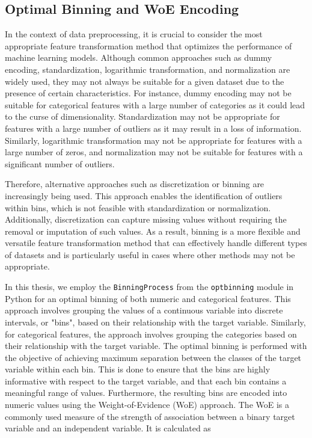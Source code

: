         \subsection{Optimal Binning and WoE Encoding}
        \label{subsec:prep-optbinning}
        
        In the context of data preprocessing, it is crucial to consider the most appropriate feature transformation method that optimizes the performance of machine learning models.
        Although common approaches such as dummy encoding, standardization, logarithmic transformation, and normalization are widely used, they may not always be suitable for a given dataset due to the presence of certain characteristics.
        For instance, dummy encoding may not be suitable for categorical features with a large number of categories as it could lead to the curse of dimensionality.
        Standardization may not be appropriate for features with a large number of outliers as it may result in a loss of information.
        Similarly, logarithmic transformation may not be appropriate for features with a large number of zeros, and normalization may not be suitable for features with a significant number of outliers.
        
        Therefore, alternative approaches such as discretization or binning are increasingly being used.
        This approach enables the identification of outliers within bins, which is not feasible with standardization or normalization.
        Additionally, discretization can capture missing values without requiring the removal or imputation of such values.
        As a result, binning is a more flexible and versatile feature transformation method that can effectively handle different types of datasets and is particularly useful in cases where other methods may not be appropriate.
        
        
        
        In this thesis, we employ the \lstinline{BinningProcess} from the \lstinline{optbinning} module in Python for an optimal binning of both numeric and categorical features.
        This approach involves grouping the values of a continuous variable into discrete intervals, or "bins", based on their relationship with the target variable.
        Similarly, for categorical features, the approach involves grouping the categories based on their relationship with the target variable.
        The optimal binning is performed with the objective of achieving maximum separation between the classes of the target variable within each bin.
        This is done to ensure that the bins are highly informative with respect to the target variable, and that each bin contains a meaningful range of values.
        Furthermore, the resulting bins are encoded into numeric values using the Weight-of-Evidence (WoE) approach. The WoE is a commonly used measure of the strength of association between a binary target variable and an independent variable. It is calculated as
        
